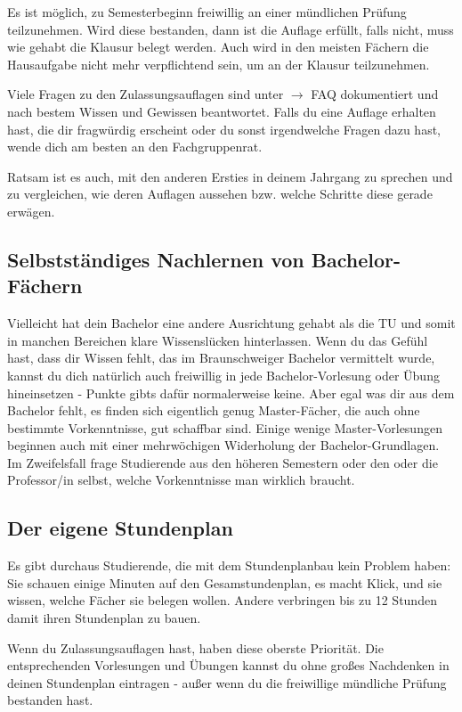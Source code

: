 \begin{multicols}{2}
	Es ist möglich, zu Semesterbeginn freiwillig an einer mündlichen Prüfung teilzunehmen. Wird diese bestanden, dann ist die Auflage erfüllt, falls nicht, muss wie gehabt die Klausur belegt werden. Auch wird in den meisten Fächern die Hausaufgabe nicht mehr verpflichtend sein, um an der Klausur teilzunehmen.

	Viele Fragen zu den Zulassungsauflagen sind unter \fginfoUrl $\rightarrow$ FAQ dokumentiert und nach bestem Wissen und Gewissen beantwortet. Falls du eine Auflage erhalten hast, die dir fragwürdig erscheint oder du sonst irgendwelche Fragen dazu hast, wende dich am besten an den Fachgruppenrat.

	Ratsam ist es auch, mit den anderen Ersties in deinem Jahrgang zu sprechen und zu vergleichen, wie deren Auflagen aussehen bzw. welche Schritte diese gerade erwägen. 

	\subsection{Selbstständiges Nachlernen von Bachelor-Fächern}
		Vielleicht hat dein Bachelor eine andere Ausrichtung gehabt als die TU und somit in manchen Bereichen klare Wissenslücken hinterlassen. Wenn du das Gefühl hast, dass dir Wissen fehlt, das im Braunschweiger Bachelor vermittelt wurde, kannst du dich natürlich auch freiwillig in jede Bachelor-Vorlesung oder Übung hineinsetzen - Punkte gibts dafür normalerweise keine. Aber egal was dir aus dem Bachelor fehlt, es finden sich eigentlich genug Master-Fächer, die auch ohne bestimmte Vorkenntnisse, gut schaffbar sind. Einige wenige Master-Vorlesungen beginnen auch mit einer mehrwöchigen Widerholung der Bachelor-Grundlagen. Im Zweifelsfall frage Studierende aus den höheren Semestern oder den oder die Professor/in selbst, welche Vorkenntnisse man wirklich braucht.

	\subsection{Der eigene Stundenplan}
		\label{masterstundenplan}
		Es gibt durchaus Studierende, die mit dem Stundenplanbau kein Problem haben: Sie schauen einige Minuten auf den Gesamstundenplan, es macht Klick, und sie wissen, welche Fächer sie belegen wollen. Andere verbringen bis zu 12 Stunden damit ihren Stundenplan zu bauen.

		Wenn du Zulassungsauflagen hast, haben diese oberste Priorität. Die entsprechenden Vorlesungen und Übungen kannst du ohne großes Nachdenken in deinen Stundenplan eintragen - außer wenn du die freiwillige mündliche Prüfung bestanden hast.


\end{multicols}
